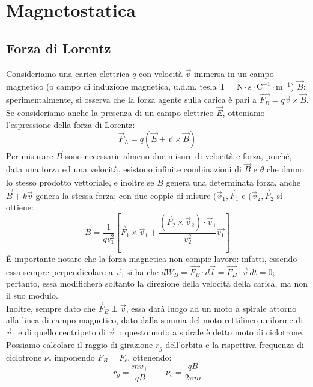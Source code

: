 \documentclass[]{article}
\begin{document}
\section{Magnetostatica}

\subsection{Forza di Lorentz}

Consideriamo una carica elettrica $ q $ con velocità $ \vec{v} $ immersa in un campo magnetico (o campo di induzione magnetica, u.d.m. tesla $ \text{T} = \text{N}\cdot\text{s}\cdot\text{C}^{-1}\cdot\text{m}^{-1} $) $ \vec{B} $: sperimentalmente, si osserva che la forza agente sulla carica è pari a $ \vec{F_B} = q \vec{v}\times\vec{B} $.\\
%
Se consideriamo anche la presenza di un campo elettrico $ \vec{E} $, otteniamo l'espressione della forza di Lorentz:
\begin{equation}
	\vec{F}_L = q ( \vec{E} + \vec{v} \times \vec{B} )
	\label{eq:f-lotentz}
\end{equation}
Per misurare $ \vec{B} $ sono necessarie almeno due misure di velocità e forza, poiché, data una forza ed una velocità, esistono infinite combinazioni di $ \vec{B} $ e $ \theta $ che danno lo stesso prodotto vettoriale, e inoltre se $ \vec{B} $ genera una determinata forza, anche $ \vec{B} + k\vec{v} $ genera la stessa forza; con due coppie di misure $ (\vec{v}_1, \vec{F}_1 $ e $ (\vec{v}_2, \vec{F}_2 $ si ottiene:
\begin{equation}
	\vec{B} = \displaystyle\frac{1}{qv_1^2} \left[ \vec{F}_1 \times \vec{v}_1 + \displaystyle\frac{(\vec{F}_2 \times \vec{v}_2) \cdot \vec{v}_1}{v_2^2} \vec{v_1} \right]
	\label{eq:}
\end{equation}
%
È importante notare che la forza magnetica non compie lavoro: infatti, essendo essa sempre perpendicolare a $ \vec{v} $, si ha che $ dW_B = \vec{F_B} \cdot d\vec{l} = \vec{F_B} \cdot \vec{v} \, dt = 0$; pertanto, essa modificherà soltanto la direzione della velocità della carica, ma non il suo modulo.\\
%
Inoltre, sempre dato che $ \vec{F}_B \perp \vec{v} $, essa darà luogo ad un moto a spirale attorno alla linea di campo magnetico, dato dalla somma del moto rettilineo uniforme di $ \vec{v}_{\parallel} $ e di quello centripeto di $ \vec{v}_{\perp} $: questo moto a spirale è detto moto di ciclotrone. Possiamo calcolare il raggio di girazione $ r_g $ dell'orbita e la rispettiva frequenza di ciclotrone $ \nu_c $ imponendo $ F_B = F_c $, ottenendo:
\begin{equation}
	r_g = \displaystyle\frac{m v_{\perp}}{q B} \qquad \nu_c = \displaystyle\frac{q B}{2\pi m}
	\label{eq:eq-ciclotrone}
\end{equation}
\end{document}
